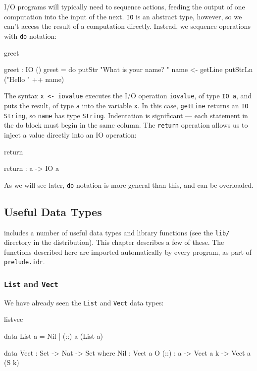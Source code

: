 I/O programs will typically need to sequence actions, feeding the output of one
computation into the input of the next. \texttt{IO} is an abstract type, however, so we
can't access the result of a computation directly. Instead, we sequence
operations with \texttt{do} notation:

\begin{SaveVerbatim}{greet}

greet : IO ()
greet = do putStr "What is your name? "
           name <- getLine
           putStrLn ("Hello " ++ name)

\end{SaveVerbatim}

\noindent
The syntax \texttt{x <- iovalue} executes the I/O operation \texttt{iovalue}, of type 
\texttt{IO a}, and
puts the result, of type \texttt{a} into the variable \texttt{x}. 
In this case, \texttt{getLine} returns an \texttt{IO String},
so \texttt{name} has type \texttt{String}. Indentation is significant --- each
statement in the do block must begin in the same column.
The \texttt{return} operation allows us to inject a value directly into an IO
operation:

\begin{SaveVerbatim}{return}

return : a -> IO a

\end{SaveVerbatim}

\noindent
As we will see later, \texttt{do} notation is more general than this, and can be
overloaded.

\subsection{Useful Data Types}

\Idris{} includes a number of useful data types and library functions (see the
\texttt{lib/} directory in the distribution). This chapter describes a few of these. The
functions described here are imported automatically by every \Idris{} program, as
part of \texttt{prelude.idr}.

\subsubsection{\texttt{List} and \texttt{Vect}}

We have already seen the \texttt{List} and \texttt{Vect} data types:

\begin{SaveVerbatim}{listvec}

data List a = Nil | (::) a (List a)

data Vect : Set -> Nat -> Set where
   Nil  : Vect a O
   (::) : a -> Vect a k -> Vect a (S k)

\end{SaveVerbatim}

